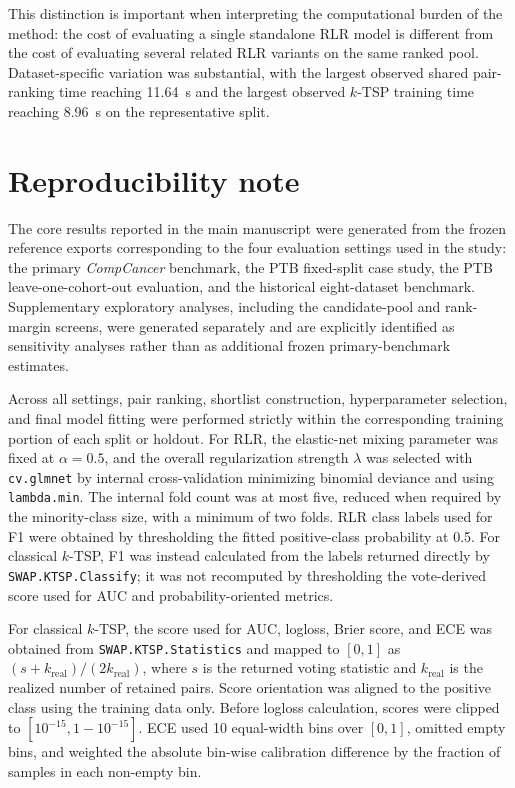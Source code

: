 \documentclass[11pt, a4paper]{article}
\begin{document}
This distinction is important when interpreting the computational burden of the method: the cost of evaluating a single standalone RLR model is different from the cost of evaluating several related RLR variants on the same ranked pool. Dataset-specific variation was substantial, with the largest observed shared pair-ranking time reaching 11.64~s and the largest observed $k$-TSP training time reaching 8.96~s on the representative split.

\section{Reproducibility note}

The core results reported in the main manuscript were generated from the frozen reference exports corresponding to the four evaluation settings used in the study: the primary \emph{CompCancer} benchmark, the PTB fixed-split case study, the PTB leave-one-cohort-out evaluation, and the historical eight-dataset benchmark. Supplementary exploratory analyses, including the candidate-pool and rank-margin screens, were generated separately and are explicitly identified as sensitivity analyses rather than as additional frozen primary-benchmark estimates.

Across all settings, pair ranking, shortlist construction, hyperparameter selection, and final model fitting were performed strictly within the corresponding training portion of each split or holdout. For RLR, the elastic-net mixing parameter was fixed at $\alpha=0.5$, and the overall regularization strength $\lambda$ was selected with \texttt{cv.glmnet} by internal cross-validation minimizing binomial deviance and using \texttt{lambda.min}. The internal fold count was at most five, reduced when required by the minority-class size, with a minimum of two folds. RLR class labels used for F1 were obtained by thresholding the fitted positive-class probability at 0.5. For classical $k$-TSP, F1 was instead calculated from the labels returned directly by \texttt{SWAP.KTSP.Classify}; it was not recomputed by thresholding the vote-derived score used for AUC and probability-oriented metrics.

For classical $k$-TSP, the score used for AUC, logloss, Brier score, and ECE was obtained from \texttt{SWAP.KTSP.Statistics} and mapped to $[0,1]$ as $(s+k_{\mathrm{real}})/(2k_{\mathrm{real}})$, where $s$ is the returned voting statistic and $k_{\mathrm{real}}$ is the realized number of retained pairs. Score orientation was aligned to the positive class using the training data only. Before logloss calculation, scores were clipped to $[10^{-15},1-10^{-15}]$. ECE used 10 equal-width bins over $[0,1]$, omitted empty bins, and weighted the absolute bin-wise calibration difference by the fraction of samples in each non-empty bin.
\end{document}
